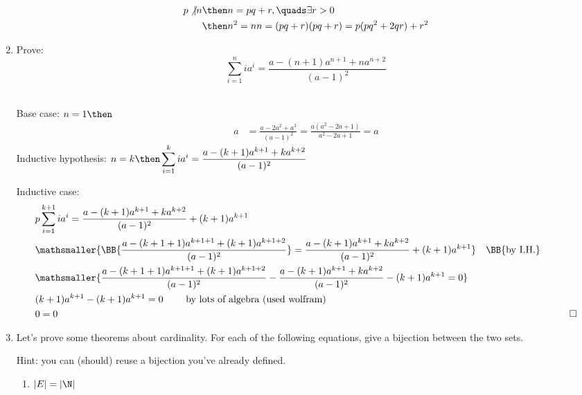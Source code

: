 \documentclass[basic, header]{nosvagor-notes}
\begin{document}
\begin{enumerate}[itemsep=4em]
    \begin{align*}
      p \not| n &\then n = pq + r, \quads \exists r > 0 \\
                &\then n^2 = nn = (pq+r)(pq+r) = p(pq^2 + 2qr) + r^2
    \end{align*}



  \newpage %

  \item Prove:
    \[%
      \sum_{i=1}^{n} ia^i = \frac{a-(n+1)a^{n+1} + na^{n+2}}{(a-1)^2}
    \]%

    \\
    Base case: \(n = 1 \then\)
    \begin{align*}
     a &= \frac{a - 2a^2 + a^3}{(a-1)^2} = \frac{a(a^2 - 2a + 1)}{a^2 - 2a + 1} = a
    \end{align*}
    Inductive hypothesis: \(\displaystyle
    n=k
    \then
      \sum_{i=1}^{k} ia^i = \frac{a-(k+1)a^{k+1} + ka^{k+2}}{(a-1)^2}
     \)

    Inductive case:
    \begin{align*}
      &p\sum_{i=1}^{k+1} ia^i = \frac{a-(k+1)a^{k+1} + ka^{k+2}}{(a-1)^2} + (k+1)a^{k+1}\\
      &\mathsmaller{\BB{\frac{a-(k+1+1)a^{k+1+1} + (k+1)a^{k+1+2}}{(a-1)^2}} =
      \frac{a-(k+1)a^{k+1} + ka^{k+2}}{(a-1)^2} + (k+1)a^{k+1}}
      \quad \text{\BB{by I.H.}} \\
      &\mathsmaller{\frac{a-(k+1+1)a^{k+1+1} + (k+1)a^{k+1+2}}{(a-1)^2} -
      \frac{a-(k+1)a^{k+1} + ka^{k+2}}{(a-1)^2} - (k+1)a^{k+1} = 0}\\
      &(k+1)a^{k+1}  - (k+1)a^{k+1} = 0 \qquad~\text{by lots of algebra (used wolfram)}\\
      &0 = 0 & \qed
    \end{align*}

  \item Let’s prove some theorems about cardinality. For each of the following
    equations, give a bijection between the two sets.

    Hint: you can (should) reuse a bijection you've already defined.
    \begin{enumerate}[leftmargin=2em]

      \item \(\displaystyle |E| = |\N| \)


\end{enumerate}
\end{enumerate}
\end{document}
